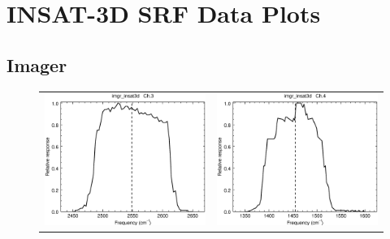 \section{INSAT-3D SRF Data Plots}
\label{app.srf_data_plots}

\subsection{Imager}

\begin{figure}[H]
  \centering
  \begin{tabular}{c c}
    \includegraphics[scale=0.35]{graphics/imgr/srf/imgr_insat3d-3.eps} &
    \includegraphics[scale=0.35]{graphics/imgr/srf/imgr_insat3d-4.eps} \\

\end{tabular}
\end{figure}
